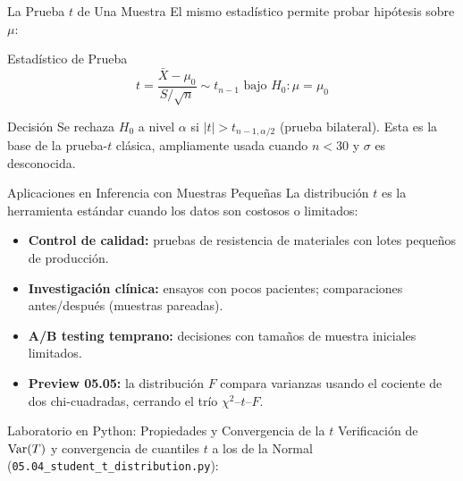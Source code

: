\documentclass[10pt, aspectratio=169]{beamer}
\begin{document}
\begin{frame}{La Prueba $t$ de Una Muestra}
  \footnotesize
  El mismo estadístico permite probar hipótesis sobre $\mu$: \pause

  \vspace{0.1cm}
  \begin{block}{Estadístico de Prueba}
    $$t = \dfrac{\bar{X}-\mu_0}{S/\sqrt{n}} \sim t_{n-1} \text{ bajo } H_0: \mu=\mu_0$$
  \end{block}

  \vspace{0.1cm}
  \pause
  \begin{alertblock}{Decisión}
    Se rechaza $H_0$ a nivel $\alpha$ si $|t| > t_{n-1,\alpha/2}$ (prueba bilateral). Esta es la base de la prueba-$t$ clásica, ampliamente usada cuando $n<30$ y $\sigma$ es desconocida.
  \end{alertblock}
\end{frame}

\begin{frame}{Aplicaciones en Inferencia con Muestras Pequeñas}
  \footnotesize
  La distribución $t$ es la herramienta estándar cuando los datos son costosos o limitados: \pause

  \vspace{0.15cm}
  \begin{itemize}\itemsep=0.12cm
    \item \textbf{Control de calidad:} pruebas de resistencia de materiales con lotes pequeños de producción. \pause
    \item \textbf{Investigación clínica:} ensayos con pocos pacientes; comparaciones antes/después (muestras pareadas). \pause
    \item \textbf{A/B testing temprano:} decisiones con tamaños de muestra iniciales limitados. \pause
    \item \textbf{Preview 05.05:} la distribución $F$ compara varianzas usando el cociente de dos chi-cuadradas, cerrando el trío $\chi^2$--$t$--$F$.
  \end{itemize}
\end{frame}

\begin{frame}[fragile]{Laboratorio en Python: Propiedades y Convergencia de la $t$}
  \scriptsize
  Verificación de $\operatorname{Var}(T)$ y convergencia de cuantiles $t$ a los de la Normal (\texttt{05.04\_student\_t\_distribution.py}):
  {
  }
\end{frame}
\end{document}
